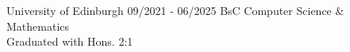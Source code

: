 \documentclass[../../cv-cs.tex]{subfiles}
\begin{document}
\cvmetaevent
{University of Edinburgh}
{09/2021 - 06/2025}
{BsC Computer Science \& \\ Mathematics \\ Graduated with Hons. 2:1}
{}
\end{document}
